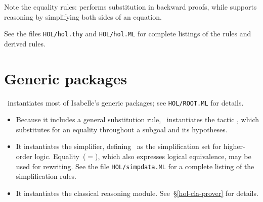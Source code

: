 Note the equality rules:  performs substitution in
backward proofs, while  supports reasoning by
simplifying both sides of an equation.

See the files {\tt HOL/hol.thy} and
{\tt HOL/hol.ML} for complete listings of the rules and
derived rules.


\section{Generic packages}
\HOL\ instantiates most of Isabelle's generic packages;
see {\tt HOL/ROOT.ML} for details.
\begin{itemize}
\item 
Because it includes a general substitution rule, \HOL\ instantiates the
tactic , which substitutes for an equality
throughout a subgoal and its hypotheses.
\item 
It instantiates the simplifier, defining~ as the
simplification set for higher-order logic.  Equality~($=$), which also
expresses logical equivalence, may be used for rewriting.  See the file
{\tt HOL/simpdata.ML} for a complete listing of the simplification
rules. 
\item 
It instantiates the classical reasoning module.  See~\S\ref{hol-cla-prover}
for details. 
\end{itemize}


